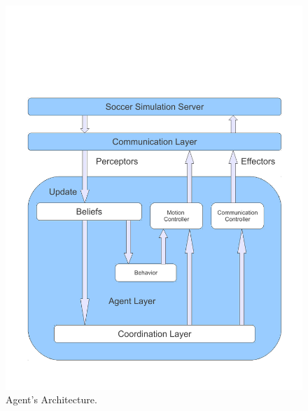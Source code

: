 \begin{figure}[!h]
\centering
  \includegraphics[trim=1cm 2cm 1cm 2cm, clip=true,scale=0.7]{Chapter3/figures/Architecture.pdf}
  \caption{Agent's Architecture.}
  \label{fig:Architecture}
\end{figure}

